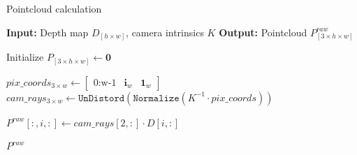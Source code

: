 \begin{algorithm}
    \caption{Pointcloud calculation}
    \label{algorithm:scene_pcd_hloop}
    \footnotesize

    \begin{algorithmic}[1]
        \State \textbf{Input:} Depth map $D_{\left[h \times w\right]}$, camera intrinsics $K$ 
        \State \textbf{Output:} Pointcloud $P^{raw}_{\left[3 \times h \times w\right]}$
        
        \State Initialize $P_{\left[3 \times h \times w\right]} \gets \mathbf{0}$

            \State $pix\_coords_{3 \times w} \gets \begin{bmatrix} \text{0:w-1} & \mathbf{i}_w & \mathbf{1}_w \end{bmatrix}$
            \State $cam\_rays_{3 \times w} \gets \texttt{UnDistord} \left( \texttt{Normalize} \left( K^{-1} \cdot pix\_coords \right)\right)$
            
            \State $P^{raw}[:, i, :] \gets cam\_rays[2, :] \cdot D[i, :]$  
        \EndFor
        
        \State \Return $P^{raw}$
    \end{algorithmic}
\end{algorithm}
